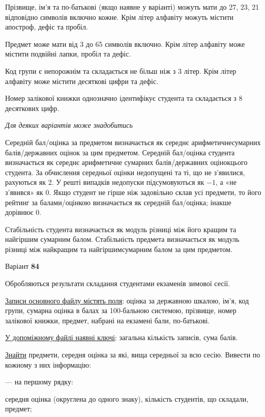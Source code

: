 \documentclass[11pt, ukrainian]{article}
\begin{document}
Прізвище, ім’я та по-батькові (якщо наявне у варіанті) можуть мати до 27, 23, 21 відповідно символів включно кожне. 
Крім літер алфавіту можуть містити апостроф, дефіс та пробіл.

Предмет може мати від 3 до 65 символів включно. 
Крім літер алфавіту може містити подвійні лапки, пробіл та дефіс.

Код групи є непорожнім та складається не більш ніж з 3 літер. 
Крім літер алфавіту може містити десяткові цифри та дефіс.


Номер залікової книжки однозначно ідентифікує студента та складається з 8 десяткових цифр. 

\bigskip\textit{Для деяких варіантів може знадобитись}

Середній бал/оцінка за предметом визначається як середнє арифметичнесумарних балів/державних оцінок за цим предметом. 
Середній бал/оцінка студента визначається як середнє арифметичне сумарних балів/державних оцінокцього студента. 
За обчислення середньої оцінки недопущені та ті, що не з’явилися, рахуються як 2.
У решті випадків недопуски підсумовуються як $-1$, а «не з’явився» як 0.
Якщо студент не гірше ніж задовільно склав усі предмети, 
то його рейтинг за балами/оцінкою визначається як середній бал/оцінка; інакше дорівнює 0.

Стабільність студента визначається як модуль різниці між його кращим та найгіршим сумарним балом.
Стабільність предмета визначається як модуль різниці між найкращим та найгіршимсумарним балом за цим предметом.






\par
\newpage
{\center Варіант  \No \textbf { 84 }\par}
\bigskip
Обробляються результати складання студентами екзаменів зимової сесії.

\underline{Записи основного файлу містять поля}: оцінка за державною шкалою, ім’я, код групи, сумарна оцінка в балах за 100-бальною системою, прізвище, номер залікової книжки, предмет, набрані на екзамені бали, по-батькові.

\underline{У допоміжному файлі наявні ключі}: загальна кількість записів, сума балів.

\underline{Знайти} предмети, середня оцінка за які, вища середньої за всю сесію. Вивести по кожному з них інформацію:\par
{\noindent}--- на першому рядку:\par
середня оцінка (округлена до одного знаку), кількість студентів, що складали, предмет;
\end{document}
